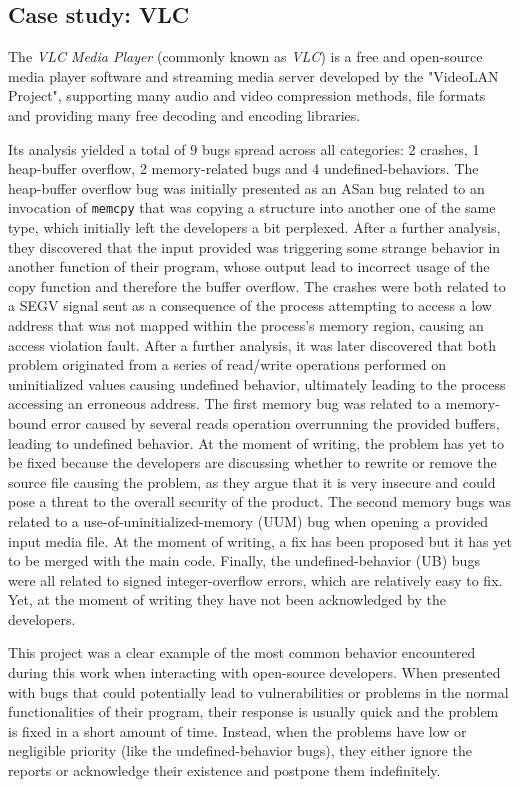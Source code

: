 \newpage
\subsection{Case study: VLC}
The \textit{VLC Media Player} (commonly known as \textit{VLC}) \cite{vlc} is a free and open-source media player software and streaming media server developed by the "VideoLAN Project", supporting many audio and video compression methods, file formats and providing many free decoding and encoding libraries.

Its analysis yielded a total of 9 bugs spread across all categories: 2 crashes, 1 heap-buffer overflow, 2 memory-related bugs and 4 undefined-behaviors.
The heap-buffer overflow bug was initially presented as an ASan bug related to an invocation of \verb|memcpy| that was copying a structure into another one of the same type, which initially left the developers a bit perplexed. After a further analysis, they discovered that the input provided was triggering some strange behavior in another function of their program, whose output lead to incorrect usage of the copy function and therefore the buffer overflow.
The crashes were both related to a SEGV signal sent as a consequence of the process attempting to access a low address that was not mapped within the process's memory region, causing an access violation fault. After a further analysis, it was later discovered that both problem originated from a series of read/write operations performed on uninitialized values causing undefined behavior, ultimately leading to the process accessing an erroneous address.
The first memory bug was related to a memory-bound error caused by several reads operation overrunning the provided buffers, leading to undefined behavior. At the moment of writing, the problem has yet to be fixed because the developers are discussing whether to rewrite or remove the source file causing the problem, as they argue that it is very insecure and could pose a threat to the overall security of the product.
The second memory bugs was related to a use-of-uninitialized-memory (UUM) bug when opening a provided input media file. At the moment of writing, a fix has been proposed but it has yet to be merged with the main code.
Finally, the undefined-behavior (UB) bugs were all related to signed integer-overflow errors, which are relatively easy to fix. Yet, at the moment of writing they have not been acknowledged by the developers.

This project was a clear example of the most common behavior encountered during this work when interacting with open-source developers.
When presented with bugs that could potentially lead to vulnerabilities or problems in the normal functionalities of their program, their response is usually quick and the problem is fixed in a short amount of time. 
Instead, when the problems have low or negligible priority (like the undefined-behavior bugs), they either ignore the reports or acknowledge their existence and postpone them indefinitely. 

